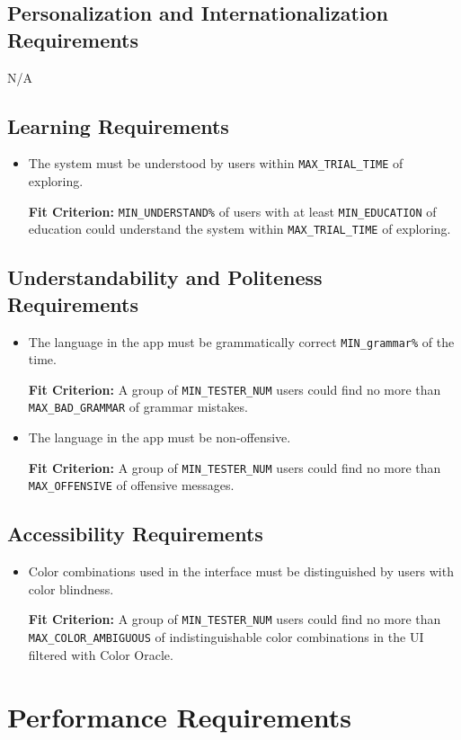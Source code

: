 \documentclass[12pt]{article}
\newcounter{nfrnum} %
\newcommand{\rthenfrnum}{NFR\refstepcounter{nfrnum}\thenfrnum:}
\begin{document}
\subsection{Personalization and Internationalization Requirements}
N/A
\subsection{Learning Requirements}
\begin{itemize}
\item[\rthenfrnum]
The system must be understood by users within \texttt{MAX\_TRIAL\_TIME} of exploring.

\textbf{Fit Criterion:} \texttt{MIN\_UNDERSTAND\%} of users with at least \texttt{MIN\_EDUCATION} of education could understand the system within \texttt{MAX\_TRIAL\_TIME} of exploring.
\end{itemize}
\subsection{Understandability and Politeness Requirements}
\begin{itemize}
\item[\rthenfrnum]
The language in the app must be grammatically correct \texttt{MIN\_grammar\%} of the time.

\textbf{Fit Criterion:} A group of \texttt{MIN\_TESTER\_NUM}  users could find no more than \texttt{MAX\_BAD\_GRAMMAR} of grammar mistakes.

\item[\rthenfrnum]
The language in the app must be non-offensive.

\textbf{Fit Criterion:} A group of \texttt{MIN\_TESTER\_NUM} users could find no more than \texttt{MAX\_OFFENSIVE} of offensive messages.
\end{itemize}
\subsection{Accessibility Requirements}
\begin{itemize}
\item[\rthenfrnum]
Color combinations used in the interface must be distinguished by users with color blindness.

\textbf{Fit Criterion:} A group of \texttt{MIN\_TESTER\_NUM} users could find no more than \texttt{MAX\_COLOR\_AMBIGUOUS} of indistinguishable color combinations in the UI filtered with Color Oracle.
\end{itemize}
\section{Performance Requirements}
\end{document}
